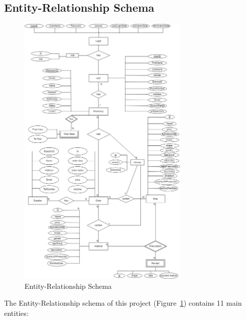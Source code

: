 \begin{samepage}
\subsection{Entity-Relationship Schema}
\begin{figure}
\centering
\includegraphics[width=0.72\textwidth]{sections/DLL/ED.png}
\caption{Entity-Relationship Schema}
\label{fig:ER}
\end{figure}
\end{samepage}
The Entity-Relationship schema of this project (Figure~\ref{fig:ER}) contains 11 main entities:
